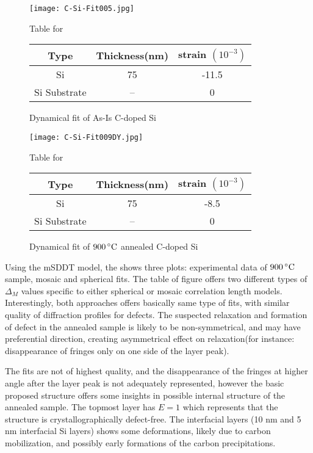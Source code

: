 \begin{figure}[h]
\caption{Dynamical fit of As-Is C-doped Si}
\label{DyFit-C-Si}
\texttt{[image: C-Si-Fit005.jpg]}
\begin{minipage}{\linewidth}
\centering
\vspace{10pt}
Table for \\
\begin{tabular}[htbp]{@{}c|cc@{}}
    \hline
  Type & Thickness(nm) & strain $(10^{-3})$ \\
    \hline
 Si	& 	75& -11.5\\
  Si Substrate & --  & 0 
  \end{tabular}
\end{minipage}
\end{figure}

\begin{figure}[h]
\caption{Dynamical fit of $900\,^{\circ}\mathrm{C}$ annealed C-doped Si}
\label{DyFit-C-Si009}
\texttt{[image: C-Si-Fit009DY.jpg]}
\begin{minipage}{\linewidth}
\centering
\vspace{10pt}
Table for \\
\begin{tabular}[htbp]{@{}c|cc@{}}
    \hline
  Type & Thickness(nm) & strain $(10^{-3})$ \\
    \hline
 Si	& 	75& -8.5\\
  Si Substrate & --  & 0 
  \end{tabular}
\end{minipage}
\end{figure}

Using the mSDDT model, the  shows three plots:  experimental data of $900\,^{\circ}\mathrm{C}$ sample, mosaic and spherical fits.  The table of figure offers two different types of $\Delta_M$  values specific to either spherical or mosaic correlation length models.  Interestingly, both approaches offers basically same type of fits, with similar quality of diffraction profiles for defects.  The suspected relaxation and formation of defect in the annealed sample is likely to be non-symmetrical, and may have preferential direction, creating asymmetrical effect on relaxation(for instance:  disappearance of fringes only on one side of the layer peak).  

The fits are not of highest quality, and the disappearance of the fringes at higher angle after the layer peak is not adequately represented,  however the basic proposed structure offers some insights in possible internal structure of the annealed sample.  The topmost layer has $E=1$ which represents that the structure is crystallographically defect-free.  The interfacial layers (10 nm and 5 nm interfacial Si layers) shows some deformations, likely due to carbon mobilization, and possibly early formations of the carbon precipitations.  


